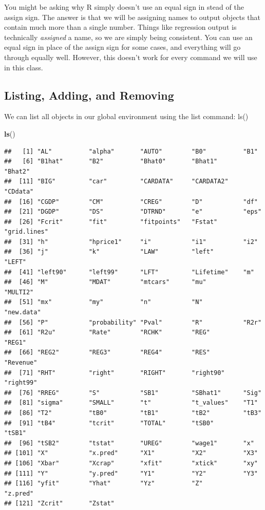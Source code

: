 \documentclass[
]{book}
\newenvironment{Shaded}{\begin{snugshade}}{\end{snugshade}}
\newcommand{\FunctionTok}[1]{\textcolor[rgb]{0.13,0.29,0.53}{\textbf{#1}}}
\newcommand{\NormalTok}[1]{#1}
\begin{document}
You might be asking why R simply doesn't use an equal sign in stead of the assign sign. The answer is that we will be assigning names to output objects that contain much more than a single number. Things like regression output is technically \emph{assigned} a name, so we are simply being consistent. You can use an equal sign in place of the assign sign for some cases, and everything will go through equally well. However, this doesn't work for every command we will use in this class.

\subsection{Listing, Adding, and Removing}\label{listing-adding-and-removing}

We can list all objects in our global environment using the list command: ls()

\begin{Shaded}
\begin{Highlighting}[]
\FunctionTok{ls}\NormalTok{()}
\end{Highlighting}
\end{Shaded}

\begin{verbatim}
##   [1] "AL"          "alpha"       "AUTO"        "B0"          "B1"         
##   [6] "B1hat"       "B2"          "Bhat0"       "Bhat1"       "Bhat2"      
##  [11] "BIG"         "car"         "CARDATA"     "CARDATA2"    "CDdata"     
##  [16] "CGDP"        "CM"          "CREG"        "D"           "df"         
##  [21] "DGDP"        "DS"          "DTRND"       "e"           "eps"        
##  [26] "Fcrit"       "fit"         "fitpoints"   "Fstat"       "grid.lines" 
##  [31] "h"           "hprice1"     "i"           "i1"          "i2"         
##  [36] "j"           "k"           "LAW"         "left"        "LEFT"       
##  [41] "left90"      "left99"      "LFT"         "Lifetime"    "m"          
##  [46] "M"           "MDAT"        "mtcars"      "mu"          "MULTI2"     
##  [51] "mx"          "my"          "n"           "N"           "new.data"   
##  [56] "P"           "probability" "Pval"        "R"           "R2r"        
##  [61] "R2u"         "Rate"        "RCHK"        "REG"         "REG1"       
##  [66] "REG2"        "REG3"        "REG4"        "RES"         "Revenue"    
##  [71] "RHT"         "right"       "RIGHT"       "right90"     "right99"    
##  [76] "RREG"        "S"           "SB1"         "SBhat1"      "Sig"        
##  [81] "sigma"       "SMALL"       "t"           "t_values"    "T1"         
##  [86] "T2"          "tB0"         "tB1"         "tB2"         "tB3"        
##  [91] "tB4"         "tcrit"       "TOTAL"       "tSB0"        "tSB1"       
##  [96] "tSB2"        "tstat"       "UREG"        "wage1"       "x"          
## [101] "X"           "x.pred"      "X1"          "X2"          "X3"         
## [106] "Xbar"        "Xcrap"       "xfit"        "xtick"       "xy"         
## [111] "Y"           "y.pred"      "Y1"          "Y2"          "Y3"         
## [116] "yfit"        "Yhat"        "Yz"          "Z"           "z.pred"     
## [121] "Zcrit"       "Zstat"
\end{verbatim}
\end{document}
